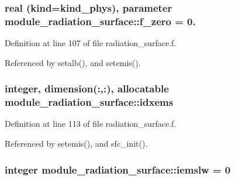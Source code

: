 \subsubsection[{\texorpdfstring{f\+\_\+zero}{f_zero}}]{\setlength{\rightskip}{0pt plus 5cm}real (kind=kind\+\_\+phys), parameter module\+\_\+radiation\+\_\+surface\+::f\+\_\+zero = 0.\hspace{0.3cm}{\ttfamily [private]}}\hypertarget{group__module__radiation__surface_ga86e4f42e46e188303b9a8e4d503d1acb}{}\label{group__module__radiation__surface_ga86e4f42e46e188303b9a8e4d503d1acb}


Definition at line 107 of file radiation\+\_\+surface.\+f.



Referenced by setalb(), and setemis().

\subsubsection[{\texorpdfstring{idxems}{idxems}}]{\setlength{\rightskip}{0pt plus 5cm}integer, dimension(\+:,\+:), allocatable module\+\_\+radiation\+\_\+surface\+::idxems\hspace{0.3cm}{\ttfamily [private]}}\hypertarget{group__module__radiation__surface_gac33f1f3441f8336d7eb7e15cba26caf7}{}\label{group__module__radiation__surface_gac33f1f3441f8336d7eb7e15cba26caf7}


Definition at line 113 of file radiation\+\_\+surface.\+f.



Referenced by setemis(), and sfc\+\_\+init().

\subsubsection[{\texorpdfstring{iemslw}{iemslw}}]{\setlength{\rightskip}{0pt plus 5cm}integer module\+\_\+radiation\+\_\+surface\+::iemslw = 0\hspace{0.3cm}{\ttfamily [private]}}\hypertarget{group__module__radiation__surface_ga3ceebb99dbffcb70a14cfcaa7b029abc}{}\label{group__module__radiation__surface_ga3ceebb99dbffcb70a14cfcaa7b029abc}


